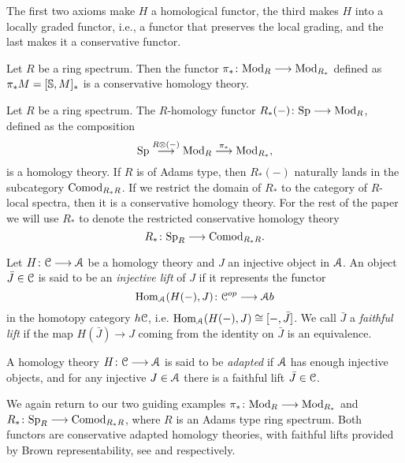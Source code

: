 \begin{remark}
    The first two axioms make $H$ a homological functor, the third makes $H$ into a locally graded functor, i.e., a functor that preserves the local grading, and the last makes it a conservative functor. 
\end{remark}

\begin{example}
    Let $R$ be a ring spectrum. Then the functor $\pi_*\colon \Mod_R\longrightarrow \Mod_{R_*}$ defined as $\pi_* M = [\S, M]_*$ is a conservative homology theory. 
\end{example}

\begin{example}
    Let $R$ be a ring spectrum. The $R$-homology functor $R_*(-)\colon \Sp \longrightarrow \Mod_R$, defined as the composition 
    $$\Sp\overset{R\otimes (-)}\longrightarrow \Mod_R \overset{\pi_*}\longrightarrow \Mod_{R_*},$$
    is a homology theory. If $R$ is of Adams type, then $R_*(-)$ naturally lands in the subcategory $\Comod_{R_*R}$. If we restrict the domain of $R_*$ to the category of $R$-local spectra, then it is a conservative homology theory. For the rest of the paper we will use $R_*$ to denote the restricted conservative homology theory 
    \[R_*\colon \Sp_R\to \Comod_{R_*R}.\]
\end{example}

\begin{definition}
    \label{ch1:def:faithful-lift}
    Let $H\colon \C\longrightarrow \A$ be a homology theory and $J$ an injective object in $\A$. An object $\bar{J}\in \C$ is said to be an \emph{injective lift} of $J$ if it represents the functor 
    $$\Hom_\A(H(-),J)\colon \C^{op}\longrightarrow \A b$$
    in the homotopy category $h \C$, i.e. $\Hom_\A(H(-),J)\cong [-,\bar{J}]$. We call $\bar{J}$ a \emph{faithful lift} if the map $H(\bar{J})\longrightarrow J$ coming from the identity on $\bar{J}$ is an equivalence. 
\end{definition}

\begin{definition}
    \label{ch1:def:adapted-homology-theory}
    A homology theory $H\colon \C\longrightarrow \A$ is said to be \emph{adapted} if $\A$ has enough injective objects, and for any injective $J \in \A$ there is a faithful lift $\bar{J}\in \C$. 
\end{definition}

\begin{example}
    We again return to our two guiding examples $\pi_*\colon \Mod_R\longrightarrow \Mod_{R_*}$ and $R_*\colon \Sp_R\longrightarrow \Comod_{R_*R}$, where $R$ is an Adams type ring spectrum. Both functors are conservative adapted homology theories, with faithful lifts provided by Brown representability, see \cite[8.2]{patchkoria-pstragowski_2021} and \cite[8.13]{patchkoria-pstragowski_2021} respectively. 
\end{example}


